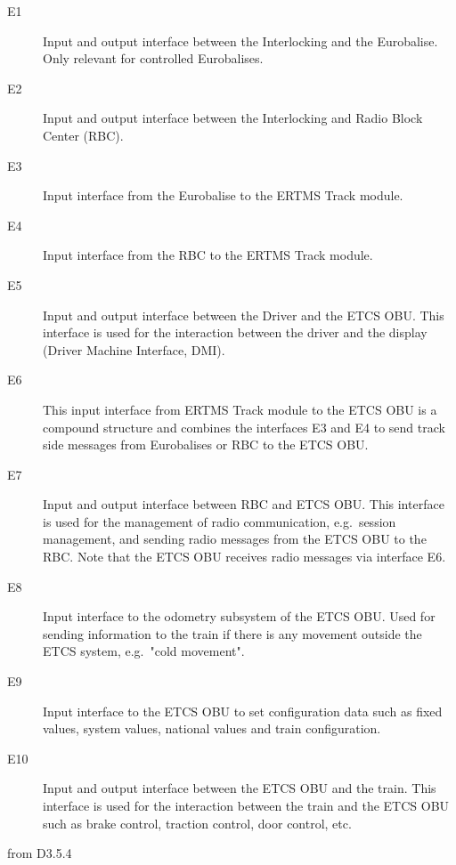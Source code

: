 \documentclass{template/openetcs_report}
\begin{document}
\begin{description}
\item[E1] Input and output interface between the Interlocking and the Eurobalise. Only relevant for controlled Eurobalises.

\item[E2] Input and output interface between the Interlocking and Radio Block Center (RBC).

\item[E3] Input interface from the Eurobalise to the ERTMS Track module.

\item[E4] Input interface from the RBC to the ERTMS Track module.

\item[E5]  Input and output interface between the Driver and the ETCS OBU. This interface is used for the interaction between the driver and the display (Driver Machine Interface, DMI).

\item[E6] This input interface from ERTMS Track module to the ETCS OBU is a compound structure and combines the interfaces E3 and E4 to send track side messages from Eurobalises or RBC to the ETCS OBU.

\item[E7] Input and output interface between RBC and ETCS OBU. This interface is used for the management of radio communication, e.g.~session management, and sending radio messages from the ETCS OBU to the RBC. Note that the ETCS OBU receives radio messages via interface E6.

\item[E8] Input interface to the odometry subsystem of the ETCS OBU. Used for sending information to the train if there is any movement outside the ETCS system, e.g.~"cold movement".

\item[E9] Input interface to the ETCS OBU to set configuration data such as fixed values, system values, national values and train configuration.

\item[E10] Input and output interface between the ETCS OBU and the train. This interface is used for the interaction between the train and the ETCS OBU such as brake control, traction control, door control, etc.

\end{description}

from D3.5.4
\end{document}
